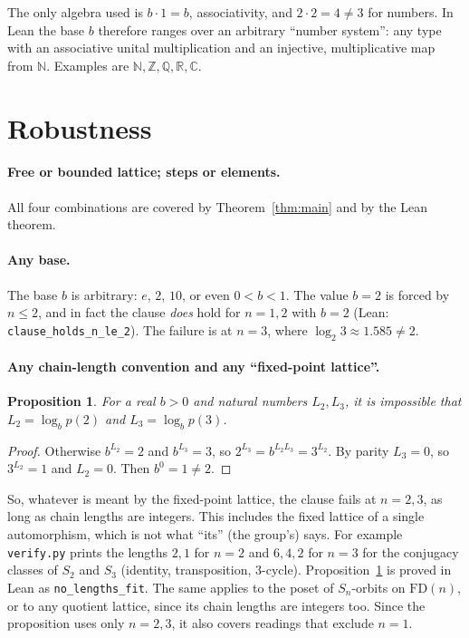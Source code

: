 \documentclass[11pt]{article}
\newtheorem{proposition}[theorem]{Proposition}
\theoremstyle{definition}
\theoremstyle{remark}
\newcommand{\N}{\mathbb{N}}
\newcommand{\R}{\mathbb{R}}
\begin{document}
The only algebra used is $b\cdot1=b$, associativity, and $2\cdot2=4\ne3$ for
numbers. In Lean the base $b$ therefore ranges over an arbitrary ``number
system'': any type with an associative unital multiplication and an injective,
multiplicative map from $\N$. Examples are $\N,\mathbb Z,\mathbb Q,\R,\mathbb C$.

\section{Robustness}\label{sec:readings}
\paragraph{Free or bounded lattice; steps or elements.} All four combinations
are covered by Theorem~\ref{thm:main} and by the Lean theorem.

\paragraph{Any base.} The base $b$ is arbitrary: $e$, $2$, $10$, or even
$0<b<1$. The value $b=2$ is forced by $n\le2$, and in fact the clause \emph{does}
hold for $n=1,2$ with $b=2$ (Lean: \texttt{clause\_holds\_n\_le\_2}). The failure is
at $n=3$, where $\log_2 3\approx1.585\ne2$.

\paragraph{Any chain-length convention and any ``fixed-point lattice''.}
\begin{proposition}\label{prop:arith}
For a real $b>0$ and natural numbers $L_2,L_3$, it is impossible that
$L_2=\log_b p(2)$ and $L_3=\log_b p(3)$.
\end{proposition}
\begin{proof}
Otherwise $b^{L_2}=2$ and $b^{L_3}=3$, so $2^{L_3}=b^{L_2L_3}=3^{L_2}$. By parity
$L_3=0$, so $3^{L_2}=1$ and $L_2=0$. Then $b^0=1\ne2$.
\end{proof}
So, whatever is meant by the fixed-point lattice, the clause fails at $n=2,3$,
as long as chain lengths are integers. This includes the fixed lattice of a
single automorphism, which is not what ``its'' (the group's) says. For example
\texttt{verify.py} prints the lengths $2,1$ for $n=2$ and $6,4,2$ for $n=3$ for the
conjugacy classes of $S_2$ and $S_3$ (identity, transposition, $3$-cycle). Proposition~\ref{prop:arith} is proved in Lean as
\texttt{no\_lengths\_fit}.
The same applies to the poset of $S_n$-orbits on $\mathrm{FD}(n)$, or to any
quotient lattice, since its chain lengths are integers too. Since the
proposition uses only $n=2,3$, it also covers readings that exclude $n=1$.
\end{document}
